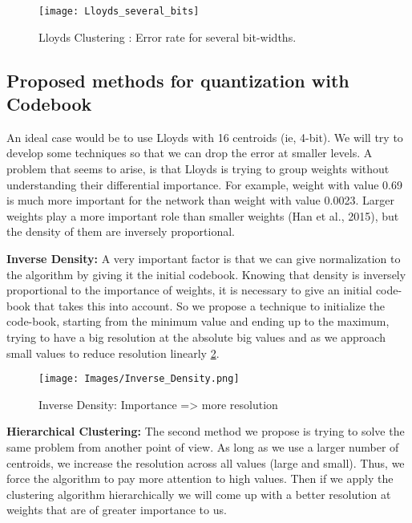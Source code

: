 \begin{figure}[h]
\centering
\texttt{[image: Lloyds\_several\_bits]} 
\decoRule
\caption[Lloyds Clustering]{Lloyds Clustering : Error rate for several bit-widths. 
}
\label{fig:16}
\end{figure}

 \subsection{Proposed methods for quantization with Codebook}
An ideal case would be to use Lloyds with 16 centroids (ie, 4-bit). We will try to develop some techniques so that we can drop the error at smaller levels. A problem that seems to arise, is that Lloyds is trying to group weights without understanding their differential importance. For example, weight with value 0.69 is much more important for the network than weight with value 0.0023. Larger weights play a more important role than smaller weights (Han et al., 2015), but the density of them are inversely proportional. \newline



\textbf{Inverse Density: } A very important factor is that we can give normalization to the algorithm by giving it the initial codebook. Knowing that density is inversely proportional to the importance of weights, it is necessary to give an initial code-book that takes this into account. So we propose a technique to initialize the code-book, starting from the minimum value and ending up to the maximum, trying to have a big resolution at the absolute big values and as we approach small values to reduce resolution linearly \ref{fig:inv_density}. \newline

\begin{figure}[h]
\centering
\texttt{[image: Images/Inverse\_Density.png]} 
\decoRule
\caption[Inverse Density]{Inverse Density: Importance => more resolution
}
\label{fig:inv_density}
\end{figure}

\textbf{Hierarchical Clustering: } The second method we propose is trying to solve the same problem from another point of view. As long as we use a larger number of centroids, we increase the resolution across all values (large and small). Thus, we force the algorithm to pay more attention to high values. Then if we apply the clustering algorithm hierarchically we will come up with a better resolution at weights that are of greater importance to us.
\newline

